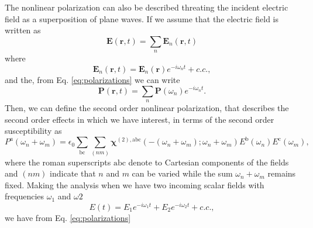 The nonlinear polarization can also be described threating the incident
electric field as a superposition of plane waves. If we assume that the
electric field is written as \cite{anderson16theoretical}
\begin{equation}
\mathbf{E} (\mathbf{r},t) = 
\sum_{n} \mathbf{E}_{n} (\mathbf{r},t)
\label{eq:planar1}
\end{equation}
where
\begin{equation}
\mathbf{E}_{n} (\mathbf{r},t) = 
\mathbf{E}_{n} (\mathbf{r}) e^{-i\omega_{n} t} +  c.c.
,
\label{eq:planar2}
\end{equation}
and the, from Eq. \eqref{eq:polarizations} we can write 
\begin{equation}
\mathbf{P} (\mathbf{r},t) =
\sum_{n} \mathbf{P} (\omega_{n}) e^{-i\omega_{n}t}
.
\label{eq:polarizations}
\end{equation}
Then, we can define the second order nonlinear polarization, that describes the
second order effects in which we have interest, in terms of the second order
susceptibility as 
\begin{equation}
P^{a} (\omega_{n} + \omega_m) =
\epsilon_{0} \sum_{\mathrm{bc}} \sum_{(nm)} 
\mathbf{\chi}^{(2), \mathrm{abc}}
\left(
-(\omega_{n} + \omega_{m}); \omega_{n} + \omega_{m}
\right)
E^{\mathrm{b}} (\omega_{n}) E^{\mathrm{c}} (\omega_{m})
,
\end{equation}
where the roman superscripts $\mathrm{abc}$ denote to Cartesian components of
the fields and $(nm)$ indicate that $n$ and $m$ can be varied while the sum
$\omega_{n} + \omega_{m}$ remains fixed. Making the analysis when we have two
incoming scalar fields with frequencies $\omega_{1}$ and $\omega{2}$
\begin{equation}
E(t) = E_{1} e^{-i\omega_{1}t} + E_{2} e^{-i\omega_{2}t} + c.c.
, 
\label{eq:two-fields}
\end{equation}
we have from Eq. \eqref{eq:polarizations} 


\stopcontents[chapters]










